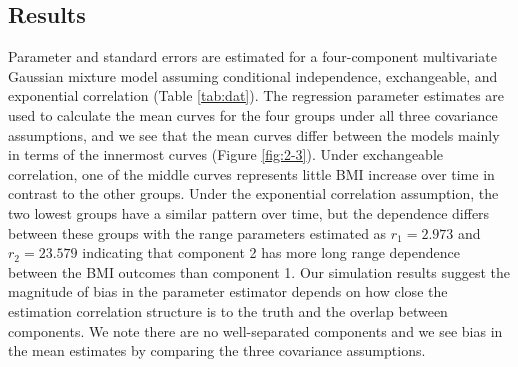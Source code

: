 \subsection{Results}\label{chp2:results}
Parameter and standard errors are estimated for a four-component multivariate Gaussian mixture model assuming conditional independence, exchangeable, and exponential correlation (Table \ref{tab:dat}). The regression parameter estimates are used to calculate the mean curves for the four groups under all three covariance assumptions, and we see that the mean curves differ between the models mainly in terms of the innermost curves (Figure \ref{fig:2-3}).  Under exchangeable correlation, one of the middle curves represents little BMI increase over time in contrast to the other groups. Under the exponential correlation assumption, the two lowest groups have a similar pattern over time, but the dependence differs between these groups with the range parameters estimated as $r_1=2.973$ and $r_2=23.579$ indicating that component 2 has more long range dependence between the BMI outcomes than component 1. Our simulation results suggest the magnitude of bias in the parameter estimator depends on how close the estimation correlation structure is to the truth and the overlap between components. We note there are no well-separated components and we see bias in the mean estimates by comparing the three covariance assumptions. 
